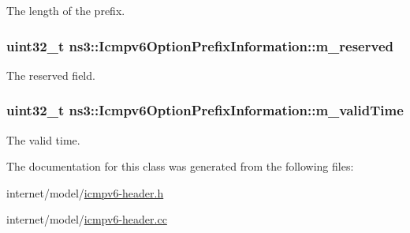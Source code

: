 The length of the prefix. 

\subsubsection[{\texorpdfstring{m\+\_\+reserved}{m_reserved}}]{\setlength{\rightskip}{0pt plus 5cm}uint32\+\_\+t ns3\+::\+Icmpv6\+Option\+Prefix\+Information\+::m\+\_\+reserved\hspace{0.3cm}{\ttfamily [private]}}\hypertarget{classns3_1_1Icmpv6OptionPrefixInformation_aa5a26beacbe5af38e7dec11b02971643}{}\label{classns3_1_1Icmpv6OptionPrefixInformation_aa5a26beacbe5af38e7dec11b02971643}


The reserved field. 

\subsubsection[{\texorpdfstring{m\+\_\+valid\+Time}{m_validTime}}]{\setlength{\rightskip}{0pt plus 5cm}uint32\+\_\+t ns3\+::\+Icmpv6\+Option\+Prefix\+Information\+::m\+\_\+valid\+Time\hspace{0.3cm}{\ttfamily [private]}}\hypertarget{classns3_1_1Icmpv6OptionPrefixInformation_aeab78dc7d079caed452d29296eec13b1}{}\label{classns3_1_1Icmpv6OptionPrefixInformation_aeab78dc7d079caed452d29296eec13b1}


The valid time. 



The documentation for this class was generated from the following files\+:\begin{DoxyCompactItemize}
\item 
internet/model/\hyperlink{icmpv6-header_8h}{icmpv6-\/header.\+h}\item 
internet/model/\hyperlink{icmpv6-header_8cc}{icmpv6-\/header.\+cc}\end{DoxyCompactItemize}
